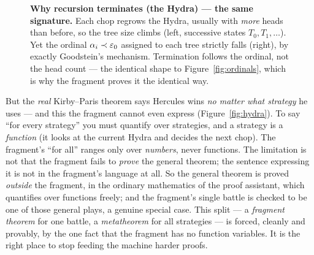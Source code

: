 \documentclass[11pt]{article}
\begin{document}
\begin{figure}[h]
\centering
{}
\caption{\textbf{Why recursion terminates (the Hydra) --- the same signature.}
Each chop regrows the Hydra, usually with \emph{more} heads than before, so the
tree size climbs (left, successive states $T_0,T_1,\dots$). Yet the ordinal
$\alpha_i\prec\varepsilon_0$ assigned to each tree strictly falls (right), by exactly
Goodstein's mechanism. Termination follows the ordinal, not the head count ---
the identical shape to Figure~\ref{fig:ordinals}, which is why the fragment
proves it the identical way.}
\label{fig:hydra-desc}
\end{figure}

But the \emph{real} Kirby--Paris theorem says Hercules wins \emph{no matter what
strategy} he uses --- and this the fragment cannot even express
(Figure~\ref{fig:hydra}). To say ``for every strategy'' you must quantify over
strategies, and a strategy is a \emph{function} (it looks at the current Hydra
and decides the next chop). The fragment's ``for all'' ranges only over
\emph{numbers}, never functions. The limitation is not that the fragment fails
to \emph{prove} the general theorem; the sentence expressing it is not in the
fragment's language at all. So the general theorem is proved \emph{outside} the
fragment, in the ordinary mathematics of the proof assistant, which quantifies
over functions freely; and the fragment's single battle is checked to be one of
those general plays, a genuine special case. This split --- a \emph{fragment
theorem} for one battle, a \emph{metatheorem} for all strategies --- is forced,
cleanly and provably, by the one fact that the fragment has no function
variables. It is the right place to stop feeding the machine harder proofs.
\end{document}
